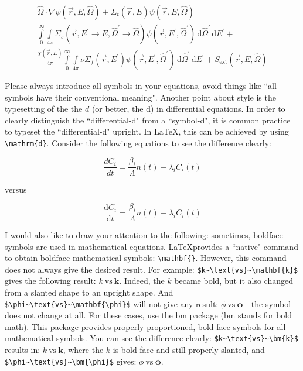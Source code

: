 \documentclass[12pt]{article}
\begin{document}
\begin{multline}
  \hat \Omega \cdot \nabla \psi ( \vec r, E, \hat \Omega )  + \Sigma_t ( \vec r, E ) \psi ( \vec r, E, \hat \Omega ) = \\ \int \limits_{0}^{\infty} \! \int \limits_{4 \pi} \! \Sigma_s ( \vec r, E^\prime \rightarrow E, \hat \Omega^\prime \rightarrow \hat \Omega ) \psi ( \vec r, E^\prime, \hat \Omega^\prime ) \, \mathrm{d}\hat \Omega^\prime \, \mathrm{d}E^\prime + \\ \frac{\chi ( \vec r, E )}{4\pi} \int \limits_0^\infty \! \int \limits_{4\pi} \nu \Sigma_f ( \vec r, E^\prime ) \psi ( \vec r, E^\prime, \hat \Omega^\prime ) \, \mathrm{d} \hat \Omega^\prime \, \mathrm{d}E^\prime + S_\text{ext} ( \vec r, E, \hat \Omega ) \label{eq::orig_trans}
\end{multline}

Please always introduce all symbols in your equations, avoid things like ``all symbols have their conventional meaning". Another point about style is the typesetting of the the $d$ (or better, the $\mathrm{d}$) in differential equations. In order to clearly distinguish the ``differential-d" from a ``symbol-d", it is common practice to typeset the ``differential-d" upright. In \LaTeX, this can be achieved by using \verb|\mathrm{d}|. Consider the following equations to see the difference clearly:

\begin{equation*}
  \frac{dC_i}{dt} = \frac{\beta_i}{\Lambda} n(t) - \lambda_i C_i(t)
\end{equation*}

versus

\begin{equation*}
  \frac{\mathrm{d}C_i}{\mathrm{d}t} = \frac{\beta_i}{\Lambda} n(t) - \lambda_i C_i(t)
\end{equation*}

I would also like to draw your attention to the following: sometimes, boldface symbols are used in mathematical equations. \LaTeX provides a ``native" command to obtain boldface mathematical symbols: \verb|\mathbf{}|. However, this command does not always give the desired result. For example: \verb|$k~\text{vs}~\mathbf{k}$| gives the following result: $k~\text{vs}~\mathbf{k}$. Indeed, the $k$ became bold, but it also changed from a slanted shape to an upright shape. And \verb|$\phi~\text{vs}~\mathbf{\phi}$| will not give any result: $\phi~\text{vs}~\mathbf{\phi}$ - the symbol does not change at all. For these cases, use the bm package (bm stands for bold math). This package provides properly proportioned, bold face symbols for all mathematical symbols. You can see the difference clearly: \verb|$k~\text{vs}~\bm{k}$| results in: $k~\text{vs}~\bm{k}$, where the $k$ is bold face and still properly slanted, and \verb|$\phi~\text{vs}~\bm{\phi}$| gives: $\phi~\text{vs}~\bm{\phi}$.
\end{document}
